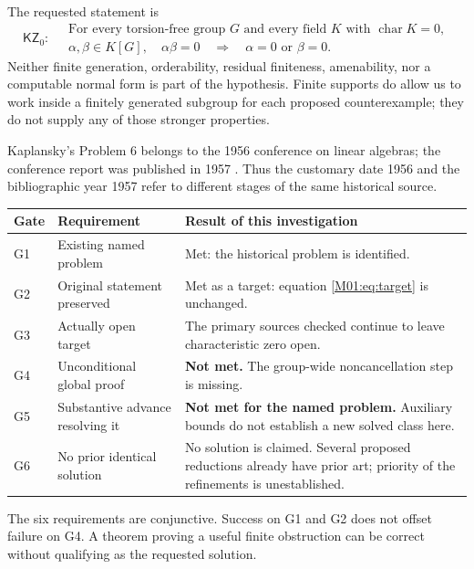 \documentclass[11pt,a4paper,oneside]{report}
\theoremstyle{definition}
\theoremstyle{remark}
\newcommand{\KZ}{\mathsf{KZ}_0}
\begin{document}
The requested statement is
\begin{equation}\label{M01:eq:target}
\boxed{\KZ:\quad
\begin{gathered}
\text{For every torsion-free group }G\text{ and every field }K
\text{ with }\operatorname{char}K=0,\\
\alpha,\beta\in K[G],\quad\alpha\beta=0
\quad\Longrightarrow\quad \alpha=0\text{ or }\beta=0.
\end{gathered}}
\end{equation}
Neither finite generation, orderability, residual finiteness, amenability,
nor a computable normal form is part of the hypothesis. Finite supports do
allow us to work inside a finitely generated subgroup for each proposed
counterexample; they do not supply any of those stronger properties.

Kaplansky's Problem 6 belongs to the 1956 conference on linear algebras;
the conference report was published in 1957 \cite{B:Kaplansky}. Thus the
customary date 1956 and the bibliographic year 1957 refer to different
stages of the same historical source.

\begin{center}
\small
\begin{tabularx}{\linewidth}{@{}P{8mm}P{35mm}Y@{}}
\toprule
Gate & Requirement & Result of this investigation\\
\midrule
G1 & Existing named problem & Met: the historical problem is identified.\\
G2 & Original statement preserved & Met as a target: equation \eqref{M01:eq:target} is unchanged.\\
G3 & Actually open target & The primary sources checked continue to leave characteristic zero open.\\
G4 & Unconditional global proof & \textbf{Not met.} The group-wide noncancellation step is missing.\\
G5 & Substantive advance resolving it & \textbf{Not met for the named problem.} Auxiliary bounds do not establish a new solved class here.\\
G6 & No prior identical solution & No solution is claimed. Several proposed reductions already have prior art; priority of the refinements is unestablished.\\
\bottomrule
\end{tabularx}
\end{center}

The six requirements are conjunctive. Success on G1 and G2 does not offset
failure on G4. A theorem proving a useful finite obstruction can be correct
without qualifying as the requested solution.
\end{document}
